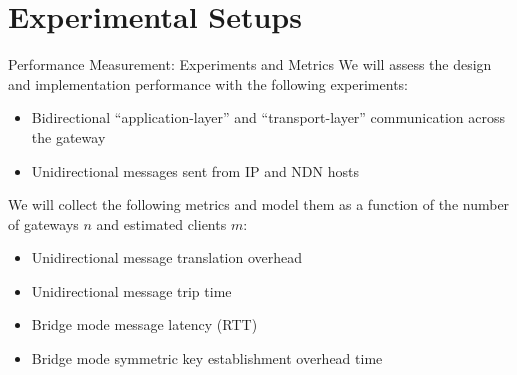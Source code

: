 \documentclass[handout]{beamer}
\begin{document}
\section{Experimental Setups}
\begin{frame}{Performance Measurement: Experiments and Metrics}
	We will assess the design and implementation performance with the following experiments:
	\begin{itemize}
		\item Bidirectional ``application-layer'' and ``transport-layer'' communication across the gateway
		\item Unidirectional messages sent from IP and NDN hosts
	\end{itemize}
	We will collect the following metrics and model them as a function of the number of gateways $n$ and estimated clients $m$:
	\begin{itemize}
		\item Unidirectional message translation overhead
		\item Unidirectional message trip time
		\item Bridge mode message latency (RTT)
		\item Bridge mode symmetric key establishment overhead time
	\end{itemize}
\end{frame}


\end{document}
